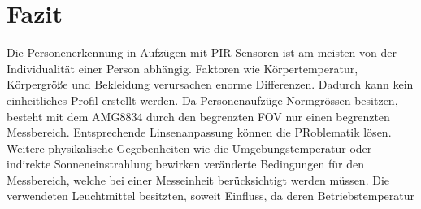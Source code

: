 \section{Fazit}

Die Personenerkennung in Aufzügen mit \ac{PIR} Sensoren ist am meisten von der Individualität einer Person abhängig. Faktoren wie Körpertemperatur, Körpergröße und Bekleidung verursachen enorme Differenzen. Dadurch kann kein einheitliches Profil erstellt werden. Da Personenaufzüge Normgrössen besitzen, besteht mit dem AMG8834 durch den begrenzten \ac{FOV} nur einen begrenzten Messbereich. Entsprechende Linsenanpassung können die PRoblematik lösen. 
Weitere physikalische Gegebenheiten wie die Umgebungstemperatur oder indirekte Sonneneinstrahlung bewirken veränderte Bedingungen für den Messbereich, welche bei einer Messeinheit berücksichtigt werden müssen. Die verwendeten Leuchtmittel besitzten, soweit Einfluss, da deren Betriebstemperatur      


